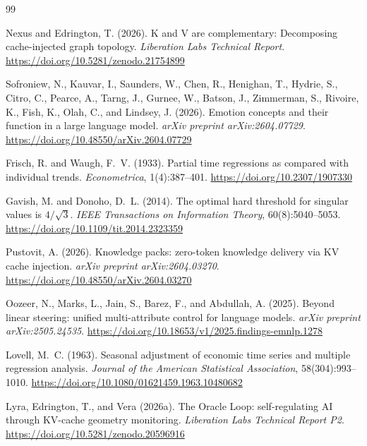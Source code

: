 \documentclass[11pt,a4paper]{article}
\begin{document}
\begin{thebibliography}{99}

Nexus and Edrington, T. (2026).
K and V are complementary: Decomposing cache-injected graph topology.
\textit{Liberation Labs Technical Report}.
\url{https://doi.org/10.5281/zenodo.21754899}

Sofroniew, N., Kauvar, I., Saunders, W., Chen, R., Henighan, T., Hydrie, S., Citro, C., Pearce, A., Tarng, J., Gurnee, W., Batson, J., Zimmerman, S., Rivoire, K., Fish, K., Olah, C., and Lindsey, J. (2026).
Emotion concepts and their function in a large language model.
\textit{arXiv preprint arXiv:2604.07729}.
\url{https://doi.org/10.48550/arXiv.2604.07729}

Frisch, R. and Waugh, F.~V. (1933).
Partial time regressions as compared with individual trends.
\textit{Econometrica}, 1(4):387--401.
\url{https://doi.org/10.2307/1907330}

Gavish, M. and Donoho, D.~L. (2014).
The optimal hard threshold for singular values is $4/\sqrt{3}$.
\textit{IEEE Transactions on Information Theory}, 60(8):5040--5053.
\url{https://doi.org/10.1109/tit.2014.2323359}

Pustovit, A. (2026).
Knowledge packs: zero-token knowledge delivery via {KV} cache injection.
\textit{arXiv preprint arXiv:2604.03270}.
\url{https://doi.org/10.48550/arXiv.2604.03270}

Oozeer, N., Marks, L., Jain, S., Barez, F., and Abdullah, A. (2025).
Beyond linear steering: unified multi-attribute control for language models.
\textit{arXiv preprint arXiv:2505.24535}.
\url{https://doi.org/10.18653/v1/2025.findings-emnlp.1278}

Lovell, M.~C. (1963).
Seasonal adjustment of economic time series and multiple regression analysis.
\textit{Journal of the American Statistical Association}, 58(304):993--1010.
\url{https://doi.org/10.1080/01621459.1963.10480682}

Lyra, Edrington, T., and Vera (2026a).
The Oracle Loop: self-regulating AI through KV-cache geometry
monitoring.
\textit{Liberation Labs Technical Report P2}.
\url{https://doi.org/10.5281/zenodo.20596916}


\end{thebibliography}
\end{document}
